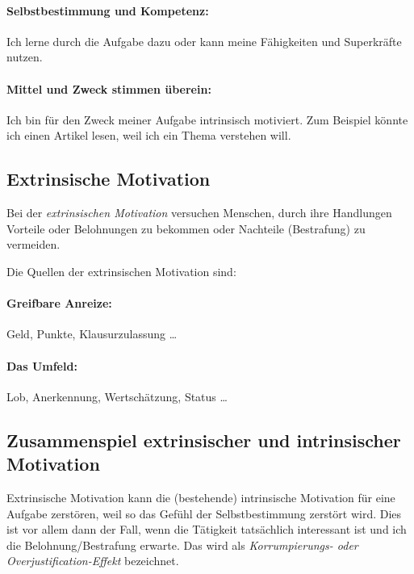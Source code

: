 \paragraph{Selbstbestimmung und Kompetenz:} Ich lerne durch die Aufgabe dazu oder kann meine Fähigkeiten und Superkräfte nutzen.

\paragraph{Mittel und Zweck stimmen überein:} Ich bin für den Zweck meiner Aufgabe intrinsisch motiviert. Zum Beispiel könnte ich einen Artikel lesen, weil ich ein Thema verstehen will.

\subsection{Extrinsische Motivation}
\label{extrinsische-motivation}

Bei der \emph{extrinsischen Motivation} versuchen Menschen, durch ihre Handlungen Vorteile oder Belohnungen zu bekommen oder Nachteile (Bestrafung) zu vermeiden.

Die Quellen der extrinsischen Motivation sind:

\paragraph{Greifbare Anreize:} Geld, Punkte, Klausurzulassung \ldots

\paragraph{Das Umfeld:} Lob, Anerkennung, Wertschätzung, Status \ldots
{}

\subsection{Zusammenspiel extrinsischer und intrinsischer Motivation}

Extrinsische Motivation kann die (bestehende) intrinsische Motivation für eine Aufgabe zerstören, weil so das Gefühl der Selbstbestimmung zerstört wird. Dies ist vor allem dann der Fall, wenn die Tätigkeit tatsächlich interessant ist und ich die Belohnung/Bestrafung erwarte. Das wird als \emph{Korrumpierungs- oder Overjustification-Effekt} bezeichnet.~\cite{extrinsic-effects}

